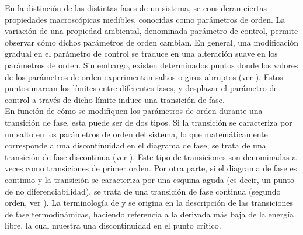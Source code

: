 En la distinción de las distintas fases de un sistema, se consideran ciertas propiedades macroscópicas medibles, conocidas como parámetros de orden. La variación de una propiedad ambiental, denominada parámetro de control, permite observar cómo dichos parámetros de orden cambian. En general, una modificación gradual en el parámetro de control se traduce en una alteración suave en los parámetros de orden. Sin embargo, existen determinados puntos donde los valores de los parámetros de orden experimentan saltos o giros abruptos (ver ). Estos puntos marcan los límites entre diferentes fases, y desplazar el parámetro de control a través de dicho límite induce una transición de fase.\\

En función de cómo se modifiquen los parámetros de orden durante una transición de fase, esta puede ser de dos tipos. Si la transición se caracteriza por un salto en los parámetros de orden del sistema, lo que matemáticamente corresponde a una discontinuidad en el diagrama de fase, se trata de una transición de fase discontinua (ver  ). Este tipo de transiciones son denominadas a veces como transiciones de primer orden. Por otra parte, si el diagrama de fase es continuo y la transición se caracteriza por una esquina aguda (es decir, un punto de no diferenciabilidad), se trata de una transición de fase continua (segundo orden, ver ). La terminología de  y  se origina en la descripción de las transiciones de fase termodinámicas, haciendo referencia a la derivada más baja de la energía libre, la cual muestra una discontinuidad en el punto crítico.\\


